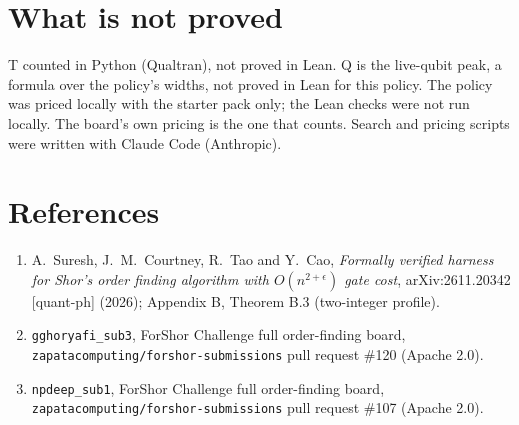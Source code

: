 \documentclass[11pt]{article}
\begin{document}
\section*{What is not proved}
T counted in Python (Qualtran), not proved in Lean. Q is the live-qubit peak, a formula over the policy's widths,
not proved in Lean for this policy. The policy was priced locally with the starter pack only; the Lean checks were not
run locally. The board's own pricing is the one that counts. Search and pricing scripts were written with Claude Code
(Anthropic).

\section*{References}
\begin{enumerate}
  \item A.~Suresh, J.~M.~Courtney, R.~Tao and Y.~Cao, \emph{Formally verified harness for Shor's order finding
        algorithm with $O(n^{2+\epsilon})$ gate cost}, arXiv:2611.20342 [quant-ph] (2026); Appendix B, Theorem B.3
        (two-integer profile).
  \item \texttt{gghoryafi\_sub3}, ForShor Challenge full order-finding board,
        \texttt{zapatacomputing/forshor-submissions} pull request \#120 (Apache 2.0).
  \item \texttt{npdeep\_sub1}, ForShor Challenge full order-finding board,
        \texttt{zapatacomputing/forshor-submissions} pull request \#107 (Apache 2.0).
\end{enumerate}
\end{document}

